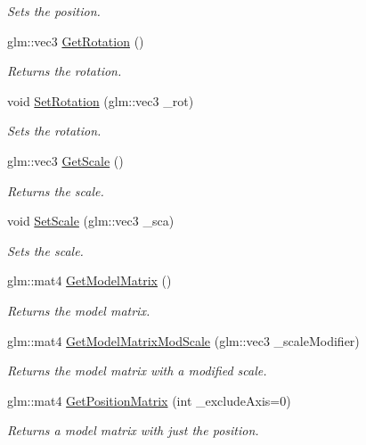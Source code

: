 \begin{DoxyCompactItemize}
\begin{DoxyCompactList}\small\item\em Sets the position. \end{DoxyCompactList}\item 
glm\+::vec3 \hyperlink{classfrontier_1_1_transform_a1be9d719815ece4e26513567ef2ac23b}{Get\+Rotation} ()
\begin{DoxyCompactList}\small\item\em Returns the rotation. \end{DoxyCompactList}\item 
void \hyperlink{classfrontier_1_1_transform_a62ed231d2cfef5b115955741ec838591}{Set\+Rotation} (glm\+::vec3 \+\_\+rot)
\begin{DoxyCompactList}\small\item\em Sets the rotation. \end{DoxyCompactList}\item 
glm\+::vec3 \hyperlink{classfrontier_1_1_transform_ab3468e4e7603e07e2a1d305c15fc4fd2}{Get\+Scale} ()
\begin{DoxyCompactList}\small\item\em Returns the scale. \end{DoxyCompactList}\item 
void \hyperlink{classfrontier_1_1_transform_ab6803171399b1ba2825f3f47f6eaffaa}{Set\+Scale} (glm\+::vec3 \+\_\+sca)
\begin{DoxyCompactList}\small\item\em Sets the scale. \end{DoxyCompactList}\item 
glm\+::mat4 \hyperlink{classfrontier_1_1_transform_a092823a36448cf201cc63e3cd46d6cc4}{Get\+Model\+Matrix} ()
\begin{DoxyCompactList}\small\item\em Returns the model matrix. \end{DoxyCompactList}\item 
glm\+::mat4 \hyperlink{classfrontier_1_1_transform_aad5a62d25417a16ad84d6f809eebc8fe}{Get\+Model\+Matrix\+Mod\+Scale} (glm\+::vec3 \+\_\+scale\+Modifier)
\begin{DoxyCompactList}\small\item\em Returns the model matrix with a modified scale. \end{DoxyCompactList}\item 
glm\+::mat4 \hyperlink{classfrontier_1_1_transform_ab6bff40a457322589a7f8a1dc92a5c42}{Get\+Position\+Matrix} (int \+\_\+exclude\+Axis=0)
\begin{DoxyCompactList}\small\item\em Returns a model matrix with just the position. \end{DoxyCompactList}\item 

\end{DoxyCompactItemize}
